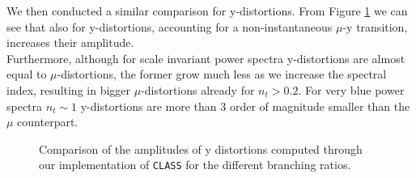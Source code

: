 We then conducted a similar comparison for y-distortions. From Figure \ref{fig:y_amplitudes} we can see that also for y-distortions, accounting for a non-instantaneous $\mu$-y transition, increases their amplitude.\\
Furthermore, although for scale invariant power spectra y-distortions are almost equal to $\mu$-distortions, the former grow much less as we increase the spectral index, resulting in bigger $\mu$-distortions already for $n_t>0.2$. For very blue power spectra $n_t\sim 1$ y-distortions are more than 3 order of magnitude smaller than the $\mu$ counterpart.  
\begin{figure}
    \centering
{}
\caption{Comparison of the amplitudes of y distortions computed through our implementation of \texttt{\texttt{CLASS}} for the different branching ratios. }
\label{fig:y_amplitudes}
\end{figure}
%


